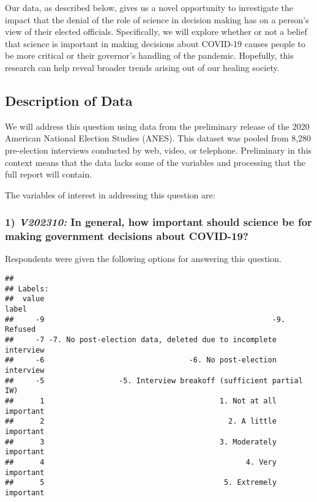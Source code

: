 \documentclass[
]{article}
\begin{document}
Our data, as described below, gives us a novel opportunity to
investigate the impact that the denial of the role of science in
decision making has on a person's view of their elected officials.
Specifically, we will explore whether or not a belief that science is
important in making decisions about COVID-19 causes people to be more
critical or their governor's handling of the pandemic. Hopefully, this
research can help reveal broader trends arising out of our healing
society.

\hypertarget{description-of-data}{%
\subsection{Description of Data}\label{description-of-data}}

We will address this question using data from the preliminary release of
the 2020 American National Election Studies (ANES). This dataset was
pooled from 8,280 pre-election interviews conducted by web, video, or
telephone. Preliminary in this context means that the data lacks some of
the variables and processing that the full report will contain.

The variables of interest in addressing this question are:

\hypertarget{v202310-in-general-how-important-should-science-be-for-making-government-decisions-about-covid-19}{%
\subsubsection{\texorpdfstring{1) \emph{V202310:} In general, how
important should science be for making government decisions about
COVID-19?}{1) V202310: In general, how important should science be for making government decisions about COVID-19?}}\label{v202310-in-general-how-important-should-science-be-for-making-government-decisions-about-covid-19}}

Respondents were given the following options for answering this
question.

\begin{verbatim}
## 
## Labels:
##  value                                                          label
##     -9                                                    -9. Refused
##     -7 -7. No post-election data, deleted due to incomplete interview
##     -6                                 -6. No post-election interview
##     -5                 -5. Interview breakoff (sufficient partial IW)
##      1                                        1. Not at all important
##      2                                          2. A little important
##      3                                        3. Moderately important
##      4                                              4. Very important
##      5                                         5. Extremely important
\end{verbatim}
\end{document}
